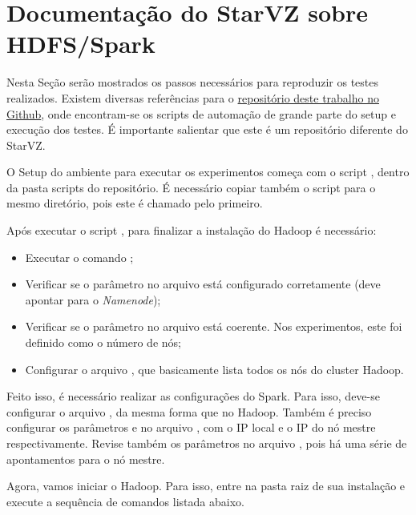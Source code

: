 \chapter{Documentação do StarVZ sobre HDFS/Spark}

Nesta Seção serão mostrados os passos necessários para reproduzir os testes 
realizados. Existem diversas referências para o 
\href{https://github.com/aksmiyazaki/tcc-spec}{repositório deste trabalho no 
Github}, onde encontram-se os scripts de automação de grande parte do setup e 
execução dos testes. É importante salientar que este é um repositório diferente 
do StarVZ.

O Setup do ambiente para executar os experimentos começa com o script 
, dentro da pasta scripts do repositório. É 
necessário copiar também o script  para o mesmo 
diretório, pois este é chamado pelo primeiro.


Após executar o script , para finalizar 
a instalação do Hadoop é necessário:

\begin{itemize}
 \item Executar o comando ;
 \item Verificar se o parâmetro  no arquivo 
 está configurado corretamente (deve apontar para o 
\emph{Namenode});
 \item Verificar se o parâmetro  no arquivo 
 está coerente. Nos experimentos, este foi definido 
como o número de nós;
\item Configurar o arquivo , que basicamente lista todos os 
nós do cluster Hadoop.
\end{itemize}

Feito isso, é necessário realizar as configurações do Spark. Para isso, deve-se 
configurar o arquivo , da mesma forma que no Hadoop. Também é 
preciso configurar os parâmetros  e 
 no arquivo , com o IP 
local e o IP do nó mestre respectivamente. Revise também os parâmetros no 
arquivo , pois há uma série de apontamentos para 
o nó mestre.

Agora, vamos iniciar o Hadoop. Para isso, entre na pasta raiz de sua instalação 
e execute a sequência de comandos listada abaixo.

